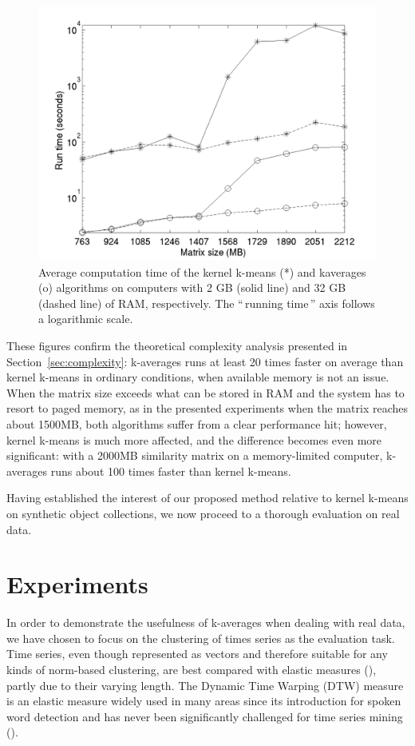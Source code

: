 \documentclass[10pt,journal,compsoc]{IEEEtran}
\newcommand{\gl}[1]{``\,#1\,''} %
\begin{document}
\begin{figure}
\center
\includegraphics[width= \columnwidth]{figures/simpleSwap.png} 
\caption{Average computation time of the kernel k-means (*) and kaverages (o) algorithms on computers with 2 GB (solid line) and 32 GB (dashed line) of RAM, respectively. The \gl{running time} axis follows a logarithmic scale.}
\label{fig:timing}
\end{figure}

These figures confirm the theoretical complexity analysis presented in Section~\ref{sec:complexity}: k-averages runs at least 20 times faster on average than kernel k-means in ordinary conditions, when  available memory is not an issue. When the matrix size exceeds what can be stored in RAM and the system has to resort to paged memory, as in the presented experiments when the matrix reaches about 1500MB, both algorithms suffer from a clear performance hit; however, kernel k-means is much more affected, and the difference becomes even more significant: with a 2000MB similarity matrix on a memory-limited computer, k-averages runs about 100 times faster than kernel k-means.

Having established the interest of our proposed method relative to kernel k-means on synthetic object collections, we now proceed to a thorough evaluation on real data.

\section{Experiments}
\label{sec:experiments}

In order to demonstrate the usefulness of k-averages when dealing with real data, we have chosen to focus on the clustering of times series as the evaluation task. Time series, even though represented as vectors and therefore suitable for any kinds of norm-based clustering, are best compared with elastic measures (\cite{Ding:2008:QMT:1454159.1454226, Wang:2013:ECR:2429736.2429754}), partly due to their varying length. The Dynamic Time Warping (DTW) measure is an elastic measure widely used in many areas since its introduction for spoken word detection \cite{1163055} and has never been significantly challenged for time series mining (\cite{conf/kdd/BerndtC94, Rakthanmanon:2013:ABD:2513092.2500489}).
\end{document}
